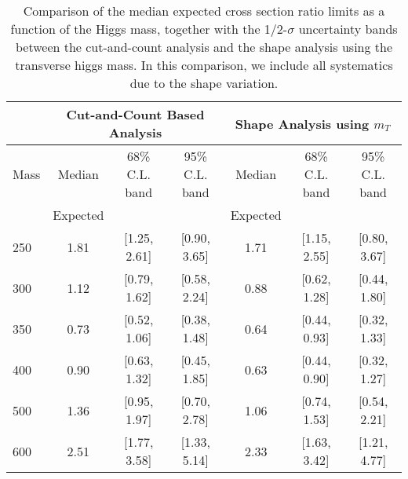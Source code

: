 \begin{table}[!ht]
\begin{center}
{\normalsize
\begin{tabular}{|l|c|c|c|c|c|c|}
\hline
      &  \multicolumn{3}{c|}{Cut-and-Count Based Analysis} &\multicolumn{3}{c|}{Shape Analysis using $m_T$} \\
\hline
Mass  &  Median      &     68\% C.L. band &  95\% C.L. band &  Median	   &	 68\% C.L. band &  95\% C.L. band\\
      &  Expected    &                    &                 &  Expected    &			&		 \\
\hline
250 & 1.81 & [1.25, 2.61] & [0.90, 3.65] & 1.71 & [1.15, 2.55] & [0.80, 3.67] \\
300 & 1.12 & [0.79, 1.62] & [0.58, 2.24] & 0.88 & [0.62, 1.28] & [0.44, 1.80] \\
350 & 0.73 & [0.52, 1.06] & [0.38, 1.48] & 0.64 & [0.44, 0.93] & [0.32, 1.33] \\
400 & 0.90 & [0.63, 1.32] & [0.45, 1.85] & 0.63 & [0.44, 0.90] & [0.32, 1.27] \\
500 & 1.36 & [0.95, 1.97] & [0.70, 2.78] & 1.06 & [0.74, 1.53] & [0.54, 2.21]\\
600 & 2.51 & [1.77, 3.58] & [1.33, 5.14] & 2.33 & [1.63, 3.42] & [1.21, 4.77]\\
\hline
\end{tabular}
}
\caption{Comparison of the median expected cross section ratio limits as a function 
of the Higgs mass, together with the 1/2-$\sigma$ uncertainty bands between the cut-and-count 
analysis and the shape analysis using the transverse higgs mass. In this comparison, we include all systematics due to 
the shape variation. }
\label{tab:mva_mtshapevscuts_withshapevar_hzz}
\end{center}
\end{table}
